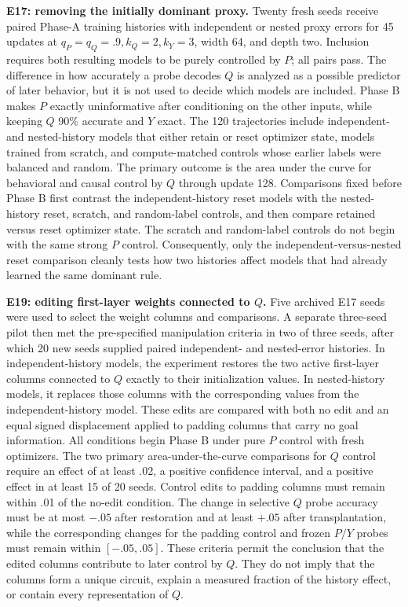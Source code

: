 \textbf{E17: removing the initially dominant proxy.} Twenty fresh seeds receive paired Phase-A training histories with independent or nested proxy errors for 45 updates at $q_P=q_Q=.9,k_Q=2,k_Y=3$, width 64, and depth two. Inclusion requires both resulting models to be purely controlled by $P$; all pairs pass. The difference in how accurately a probe decodes $Q$ is analyzed as a possible predictor of later behavior, but it is not used to decide which models are included. Phase B makes $P$ exactly uninformative after conditioning on the other inputs, while keeping $Q$ 90\% accurate and $Y$ exact. The 120 trajectories include independent- and nested-history models that either retain or reset optimizer state, models trained from scratch, and compute-matched controls whose earlier labels were balanced and random. The primary outcome is the area under the curve for behavioral and causal control by $Q$ through update 128. Comparisons fixed before Phase B first contrast the independent-history reset models with the nested-history reset, scratch, and random-label controls, and then compare retained versus reset optimizer state. The scratch and random-label controls do not begin with the same strong $P$ control. Consequently, only the independent-versus-nested reset comparison cleanly tests how two histories affect models that had already learned the same dominant rule.

\textbf{E19: editing first-layer weights connected to $Q$.} Five archived E17 seeds were used to select the weight columns and comparisons. A separate three-seed pilot then met the pre-specified manipulation criteria in two of three seeds, after which 20 new seeds supplied paired independent- and nested-error histories. In independent-history models, the experiment restores the two active first-layer columns connected to $Q$ exactly to their initialization values. In nested-history models, it replaces those columns with the corresponding values from the independent-history model. These edits are compared with both no edit and an equal signed displacement applied to padding columns that carry no goal information. All conditions begin Phase B under pure $P$ control with fresh optimizers. The two primary area-under-the-curve comparisons for $Q$ control require an effect of at least .02, a positive confidence interval, and a positive effect in at least 15 of 20 seeds. Control edits to padding columns must remain within .01 of the no-edit condition. The change in selective $Q$ probe accuracy must be at most $-.05$ after restoration and at least $+.05$ after transplantation, while the corresponding changes for the padding control and frozen $P/Y$ probes must remain within $[-.05,.05]$. These criteria permit the conclusion that the edited columns contribute to later control by $Q$. They do not imply that the columns form a unique circuit, explain a measured fraction of the history effect, or contain every representation of $Q$.

